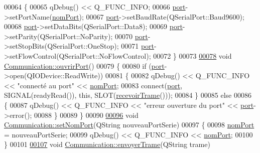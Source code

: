 \begin{DoxyCode}
00064 \{
00065     qDebug() << Q\_FUNC\_INFO;
00066     \hyperlink{class_communication_aff7d55208f31232fbdc1dcec488908f1}{port}->setPortName(\hyperlink{class_communication_a5fa89ee1fc732871f3f8f177fb50bf2a}{nomPort});
00067     \hyperlink{class_communication_aff7d55208f31232fbdc1dcec488908f1}{port}->setBaudRate(QSerialPort::Baud9600);
00068     \hyperlink{class_communication_aff7d55208f31232fbdc1dcec488908f1}{port}->setDataBits(QSerialPort::Data8);
00069     \hyperlink{class_communication_aff7d55208f31232fbdc1dcec488908f1}{port}->setParity(QSerialPort::NoParity);
00070     \hyperlink{class_communication_aff7d55208f31232fbdc1dcec488908f1}{port}->setStopBits(QSerialPort::OneStop);
00071     \hyperlink{class_communication_aff7d55208f31232fbdc1dcec488908f1}{port}->setFlowControl(QSerialPort::NoFlowControl);
00072 \}
00073 
\hyperlink{class_communication_ad5969603a6b7232d0227a461fd479251}{00078} \textcolor{keywordtype}{void} \hyperlink{class_communication_ad5969603a6b7232d0227a461fd479251}{Communication::ouvrirPort}()
00079 \{
00080     \textcolor{keywordflow}{if} (\hyperlink{class_communication_aff7d55208f31232fbdc1dcec488908f1}{port}->open(QIODevice::ReadWrite))
00081     \{
00082         qDebug() << Q\_FUNC\_INFO << \textcolor{stringliteral}{"connecté au port"} << \hyperlink{class_communication_a5fa89ee1fc732871f3f8f177fb50bf2a}{nomPort};
00083         connect(\hyperlink{class_communication_aff7d55208f31232fbdc1dcec488908f1}{port}, SIGNAL(readyRead()), \textcolor{keyword}{this}, SLOT(\hyperlink{class_communication_a0b8edc96112e71e1ec4a28cc6309cbbc}{recevoirTrame}()));
00084     \}
00085     \textcolor{keywordflow}{else}
00086     \{
00087         qDebug() << Q\_FUNC\_INFO << \textcolor{stringliteral}{"erreur ouverture du port"} << \hyperlink{class_communication_aff7d55208f31232fbdc1dcec488908f1}{port}->error();
00088     \}
00089 \}
00090 
\hyperlink{class_communication_a06a0f05f4555c6e3586e1800bbaa5e13}{00096} \textcolor{keywordtype}{void} \hyperlink{class_communication_a06a0f05f4555c6e3586e1800bbaa5e13}{Communication::setNomPort}(QString nouveauPortSerie)
00097 \{
00098     \hyperlink{class_communication_a5fa89ee1fc732871f3f8f177fb50bf2a}{nomPort} = nouveauPortSerie;
00099     qDebug() << Q\_FUNC\_INFO << \hyperlink{class_communication_a5fa89ee1fc732871f3f8f177fb50bf2a}{nomPort};
00100 \}
00101 
\hyperlink{class_communication_a53c26abe4c16ff155a15929dd5ad07cf}{00107} \textcolor{keywordtype}{void} \hyperlink{class_communication_a53c26abe4c16ff155a15929dd5ad07cf}{Communication::envoyerTrame}(QString trame)

\end{DoxyCode}
